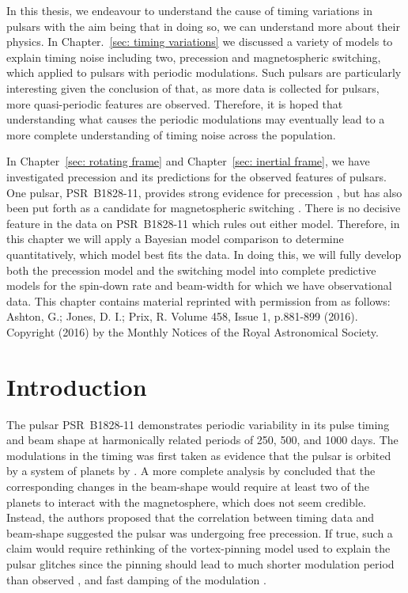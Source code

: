\documentclass[../full_thesis/full_thesis.tex]{subfiles}
\newcommand{\thisdir}{../comparing_periodic_modulations}
\begin{document}


In this thesis, we endeavour to understand the cause of timing variations in pulsars
with the aim being that in doing so, we can understand more about their physics.
In Chapter.~\ref{sec: timing variations} we discussed a variety of models to
explain timing noise including two, precession and magnetospheric switching,
which applied to pulsars with periodic modulations. Such pulsars are particularly
interesting given the conclusion of \citet{Hobbs2010} that, as more data is
collected for pulsars, more quasi-periodic features are observed. Therefore, it
is hoped that understanding what causes the periodic modulations may eventually
lead to a more complete understanding of timing noise across the population.

In Chapter~\ref{sec: rotating frame} and Chapter~\ref{sec: inertial frame}, we
have investigated precession and its predictions for the observed features of
pulsars. One pulsar, PSR~B1828-11, provides strong evidence for precession
\citep{Stairs2000}, but has also been put forth as a candidate for
magnetospheric switching \citep{Lyne2010}. There is no decisive feature in the
data on PSR~B1828-11 which rules out either model. Therefore, in this chapter
we will apply a Bayesian model comparison to determine quantitatively, which
model best fits the data. In doing this, we will fully develop both the
precession model and the switching model into complete predictive models for
the spin-down rate and beam-width for which we have observational data.  This
chapter contains material reprinted with permission from \citet{Ashton2016} as
follows: Ashton, G.; Jones, D. I.; Prix, R. Volume 458, Issue 1, p.881-899
(2016).  Copyright (2016) by the Monthly Notices of the Royal Astronomical
Society.

\section{Introduction}
\label{sec: introduction}

The pulsar PSR~B1828-11 demonstrates periodic variability in its pulse timing and
beam shape at harmonically related periods of 250, 500, and 1000 days. The
modulations in the timing was first taken as evidence that the pulsar is
orbited by a system of planets by \citet{Bailes1993}. A more complete analysis
by \citet{Stairs2000} concluded that the corresponding changes in the
beam-shape would require at least two of the planets to interact with the
magnetosphere, which does not seem credible. Instead, the authors proposed that
the correlation between timing data and beam-shape suggested the pulsar was
undergoing free precession. If true, such a claim would require rethinking of
the vortex-pinning model used to explain the pulsar glitches since the pinning
should lead to much shorter modulation period than observed \citep{Shaham1977},
and fast damping of the modulation \citep{Link2003}.
\end{document}
